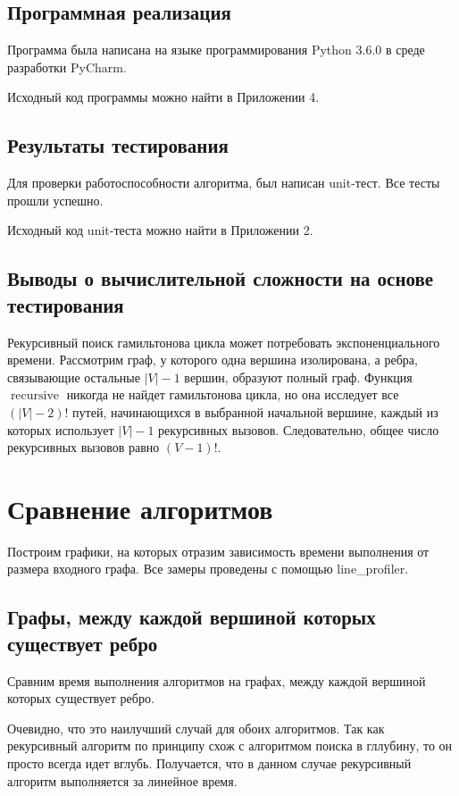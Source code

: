 \subsection{Программная реализация}
Программа была написана на языке программирования Python 3.6.0 в среде разработки PyCharm.

Исходный код программы можно найти в Приложении 4.

\subsection{Результаты тестирования}
Для проверки работоспособности алгоритма, был написан unit-тест.
Все тесты прошли успешно.

Исходный код unit-теста можно найти в Приложении 2.

\subsection{Выводы о вычислительной сложности на основе тестирования}
Рекурсивный поиск гамильтонова цикла может потребовать экспоненциального времени.
Рассмотрим граф, у которого одна вершина изолирована, а ребра, связывающие остальные $|V| - 1$ вершин, образуют полный граф.
Функция $\operatorname{recursive}$ никогда не найдет гамильтонова цикла, но она исследует все $(|V| - 2)!$ путей, начинающихся в выбранной начальной вершине, каждый из которых использует $|V| - 1$ рекурсивных вызовов.
Следовательно, общее число рекурсивных вызовов равно $(V - 1)!$.

\newpage

\section{Сравнение алгоритмов}
Построим графики, на которых отразим зависимость времени выполнения от размера входного графа.
Все замеры проведены с помощью line\_profiler.

\subsection{Графы, между каждой вершиной которых существует ребро}
Сравним время выполнения алгоритмов на графах, между каждой вершиной которых существует ребро.

Очевидно, что это наилучший случай для обоих алгоритмов.
Так как рекурсивный алгоритм по принципу схож с алгоритмом поиска в гллубину, то он просто всегда идет вглубь.
Получается, что в данном случае рекурсивный алгоритм выполняется за линейное время.
\\[0.5cm]

